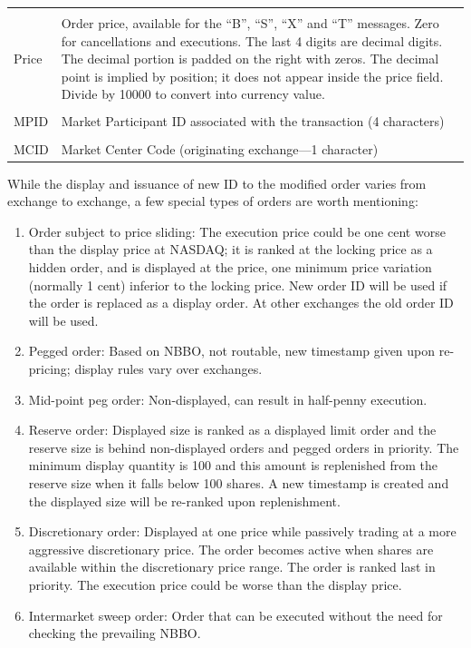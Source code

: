 \begin{table}[!ht]
\begin{tabular}{lp{}}
	& \\
	Price & Order price, available for the ``B'', ``S'', ``X'' and ``T'' messages. \newline Zero for cancellations and executions. The last 4 digits are decimal digits. The decimal portion is padded on the right with zeros. The decimal point is implied by position; it does not appear inside the price field. Divide by 10000 to convert into currency value. \\ 
	& \\
	MPID & Market Participant ID associated with the transaction (4 characters) \\
	& \\
	MCID & Market Center Code (originating exchange---1 character) 
	\end{tabular}
	\end{table}
	

While the display and issuance of new ID to the modified order varies from exchange to exchange, a few special types of orders are worth mentioning:
        \begin{enumerate}[1.]
        \item Order subject to price sliding: The execution price could be one cent worse than the display price at NASDAQ; it is ranked at the locking price as a hidden order, and is displayed at the price, one minimum price variation (normally 1 cent) inferior to the locking price. New order ID will be used if the order is replaced as a display order. At other exchanges the old order ID will be used.
        \item Pegged order: Based on NBBO, not routable, new timestamp given upon re-pricing; display rules vary over exchanges.
        \item Mid-point peg order: Non-displayed, can result in half-penny execution.
        \item Reserve order: Displayed size is ranked as a displayed limit order and the reserve size is behind non-displayed orders and pegged orders in priority. The minimum display quantity is 100 and this amount is replenished from the reserve size when it falls below 100 shares. A new timestamp is created and the displayed size will be re-ranked upon replenishment.
        \item Discretionary order: Displayed at one price while passively trading at a more aggressive discretionary price. The order becomes active when shares are available within the discretionary price range. The order is ranked last in priority. The execution price could be worse than the display price.
        \item Intermarket sweep order: Order that can be executed without the need for checking the prevailing NBBO.  
        \end{enumerate}


